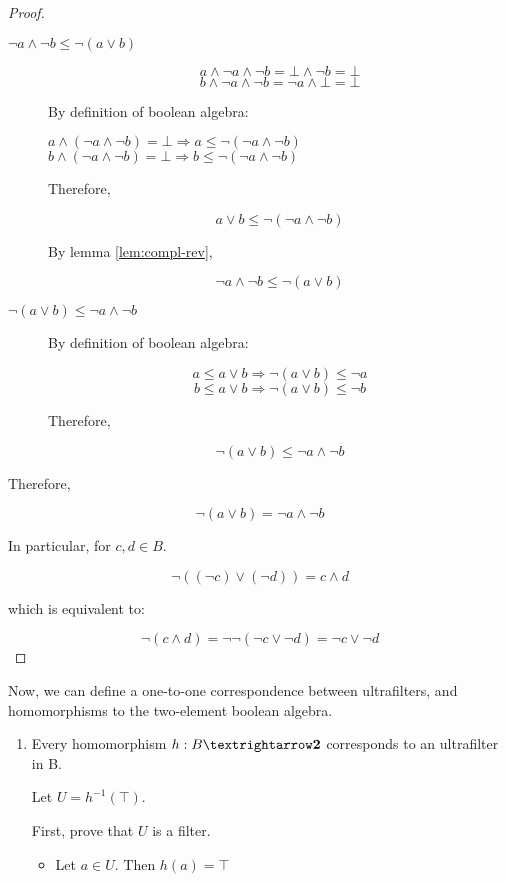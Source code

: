 \documentclass[notitlepage,a4paper]{article}
\begin{document}
\begin{enumerate}
     \begin{proof}
       \begin{description}
         \item[$¬a ∧ ¬b ≤ ¬(a ∨ b)$]

           $$a ∧ ¬a ∧ ¬b = ⊥ ∧ ¬b = ⊥$$
           $$b ∧ ¬a ∧ ¬b = ¬a ∧ ⊥ = ⊥$$

           By definition of boolean algebra:

           $a ∧ (¬a ∧ ¬b) = ⊥ \Rightarrow a ≤ ¬(¬a ∧ ¬b)$
           $b ∧ (¬a ∧ ¬b) = ⊥ \Rightarrow b ≤ ¬(¬a ∧ ¬b)$

           Therefore,

           $$a ∨ b ≤ ¬(¬a ∧ ¬b)$$

           By lemma \ref{lem:compl-rev},

           $$¬a ∧ ¬b ≤ ¬(a ∨ b)$$

         \item[$¬(a ∨ b) ≤ ¬a ∧ ¬b$]

           By definition of boolean algebra:

           $$a ≤ a ∨ b ⇒ ¬(a ∨ b) ≤ ¬a$$
           $$b ≤ a ∨ b ⇒ ¬(a ∨ b) ≤ ¬b$$

           Therefore,

           $$¬(a ∨ b) ≤ ¬a ∧ ¬b$$
       \end{description} 

       Therefore,

       $$¬(a ∨ b) = ¬a ∧ ¬b$$

       In particular, for $c,d ∈ B$.

       $$¬((¬c) ∨ (¬d)) = c ∧ d$$

       which is equivalent to:

       $$¬(c ∧ d) = ¬¬(¬c ∨ ¬d) = ¬c ∨ ¬d$$
   \end{proof}

   Now, we can define a one-to-one correspondence between ultrafilters,
   and homomorphisms to the two-element boolean algebra.

   \begin{enumerate}
     \item Every homomorphism $h : B → \text{\bf 2}$ corresponds to an
       ultrafilter in B.

       Let $U = h^{-1}(⊤)$.

       First, prove that $U$ is a filter.

       \begin{itemize}
         \item
           Let $a ∈ U$. Then $h(a) = ⊤$


\end{itemize}
\end{enumerate}
\end{enumerate}
\end{document}
